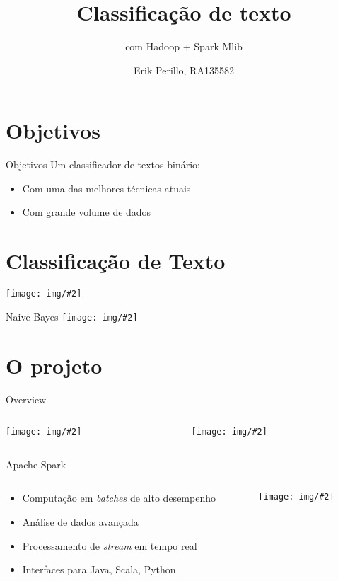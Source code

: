 \documentclass[11pt]{beamer}
\title{Classificação de texto}
\subtitle{{\small com Hadoop + Spark Mlib}}
\author{Erik Perillo, RA135582}
\date{}
\institute{Universidade Estadual de Campinas}
\newcommand{\img}[2][width=1.0\textwidth]
	{\centering \texttt{[image: img/\#2]}}
\newcommand{\tit}[1]{\textit{#1}}
\begin{document}
\maketitle

\section{Objetivos}

\begin{frame}{Objetivos}
	Um classificador de textos binário:
	\begin{itemize}
		\item Com uma das melhores técnicas atuais
		\item Com grande volume de dados
	\end{itemize}
\end{frame}

\section{Classificação de Texto}

\begin{frame}{}
	\img[width=1.0\linewidth]{text.png}
\end{frame}

\begin{frame}{Naive Bayes}
	\img[width=0.7\linewidth]{naive.png}
\end{frame}

\section{O projeto}

\begin{frame}{Overview}
	\begin{columns}
		\begin{column}{0.5\textwidth}
			\img[width=0.7\linewidth]{hadoop_logo.png}
		\end{column}
		\begin{column}{0.5\textwidth}
			\img[width=0.7\linewidth]{spark_logo.png}
		\end{column}
	\end{columns}
\end{frame}

\begin{frame}{Apache Spark}
	\begin{columns}
		\begin{column}{0.5\textwidth}
			\begin{itemize}
				\item Computação em \tit{batches} de alto desempenho
				\item Análise de dados avançada
				\item Processamento de \tit{stream} em tempo real
				\item Interfaces para Java, Scala, Python
			\end{itemize}
		\end{column}
		\begin{column}{0.5\textwidth}
			\img[width=0.7\linewidth]{spark_logo.png}
		\end{column}
	\end{columns}
\end{frame}
\end{document}
